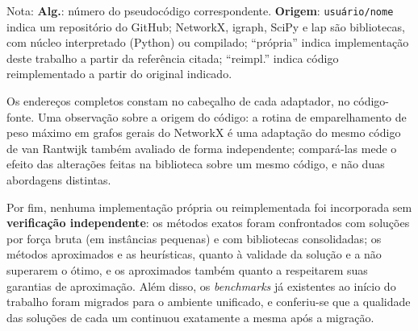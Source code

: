 \begin{table}[H]
    \smallskip
    \parbox{\textwidth}{\scriptsize Nota: \textbf{Alg.}: número do pseudocódigo correspondente. \textbf{Origem}: \texttt{usuário/nome} indica um repositório do GitHub; NetworkX, igraph, SciPy e lap são bibliotecas, com núcleo interpretado (Python) ou compilado; ``própria'' indica implementação deste trabalho a partir da referência citada; ``reimpl.'' indica código reimplementado a partir do original indicado.}
\end{table}

Os endereços completos constam no cabeçalho de cada adaptador, no código-fonte.
Uma observação sobre a origem do código: a rotina de emparelhamento de peso máximo em
grafos gerais do NetworkX é uma adaptação do mesmo código de van Rantwijk também
avaliado de forma independente; compará-las mede o efeito das alterações feitas na
biblioteca sobre um mesmo código, e não duas abordagens distintas.

Por fim, nenhuma implementação própria ou reimplementada foi incorporada sem
\textbf{verificação independente}: os métodos exatos foram confrontados com
soluções por força bruta (em instâncias pequenas) e com bibliotecas
consolidadas; os métodos aproximados e as heurísticas, quanto à validade da
solução e a não superarem o ótimo, e os aproximados também quanto a respeitarem
suas garantias de aproximação. Além disso, os \textit{benchmarks}
já existentes ao início do trabalho foram migrados para o ambiente unificado, e
conferiu-se que a qualidade das soluções de cada um continuou exatamente a mesma
após a migração.
